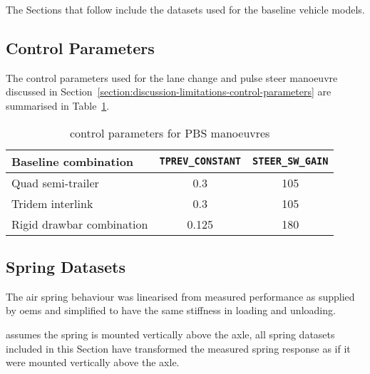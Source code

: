 The Sections that follow include the \trucksim{} datasets used for the baseline vehicle models.

\subsection{Control Parameters}\label{section:control-parameters}

The control parameters used for the lane change and pulse steer manoeuvre discussed in Section~\ref{section:discussion-limitations-control-parameters} are summarised in Table~\ref{table:baseline-manoeuvre-control-parameters}.


\begin{table}[H]
  \centering\footnotesize
  \caption{\trucksim{} control parameters for PBS manoeuvres}
    \begin{tabular}{lcc}
    \toprule
    \textbf{Baseline combination} & \textbf{\texttt{TPREV\_CONSTANT}} & \textbf{\texttt{STEER\_SW\_GAIN}} \\
    \midrule
    Quad semi-trailer & 0.3 & 105 \\
    Tridem interlink & 0.3 & 105 \\
    Rigid drawbar combination & 0.125 & 180 \\
    \bottomrule
    \end{tabular}%
  \label{table:baseline-manoeuvre-control-parameters}%
\end{table}%


\subsection{Spring Datasets}\label{section:baseline-spring-datasets}

 The air spring behaviour was linearised from measured performance as supplied by \glspl{oem} and simplified to have the same stiffness in loading and unloading.

 \trucksim{} assumes the spring is mounted vertically above the axle, all spring datasets included in this Section have transformed the measured spring response as if it were mounted vertically above the axle.
 
